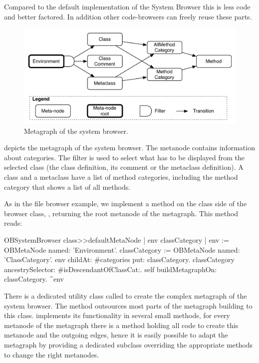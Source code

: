 \documentclass[a4paper,10pt,twoside]{book}
\begin{document}
Compared to the default implementation of the \pharo System Browser this is less code and better factored. In addition other code-browsers can freely reuse these parts.

\begin{figure}[!ht]
\begin{center}
\includegraphics[scale=0.55]{ob-graph.pdf}
\caption{Metagraph of the system browser.} 
\end{center}
\end{figure}

 depicts the metagraph of the system browser. The metanode  contains information about categories. The filter is used to select what has to be displayed from the selected class (\ie the class definition, its comment or the metaclass definition). A class and a metaclass have a list of method categories, including the  method category that shows a list of all methods.

As in the file browser example, we implement a method  on the class side of the browser class, \ie {}, returning the root metanode of the metagraph. This method reads:

\begin{code}{}
OBSystemBrowser class>>defaultMetaNode
	| env classCategory |
	env := OBMetaNode named: 'Environment'.
	classCategory := OBMetaNode named: 'ClassCategory'.
	env childAt: #categories put: classCategory.
	classCategory ancestrySelector: #isDescendantOfClassCat:.
	self buildMetagraphOn: classCategory.
	^env
\end{code}

There is a dedicated utility class called  to create the complex metagraph of the system browser. The method  outsources most parts of the metagraph building to this class.  implements its functionality in several small methods, \ie for every metanode of the metagraph there is a method holding all code to create this metanode and the outgoing edges, hence it is easily possible to adapt the metagraph by providing a dedicated subclass overriding the appropriate methods to change the right metanodes. 
\end{document}

